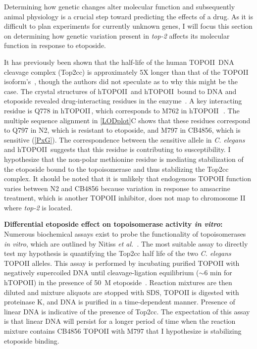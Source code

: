 \documentclass[12pt]{article}
\begin{document}
Determining how genetic changes alter molecular function and subsequently animal physiology is a crucial step toward predicting the effects of a drug. As it is difficult to plan experiments for currently unknown genes, I will focus this section on determining how genetic variation present in {\it top-2} affects its molecular function in response to etoposide.
\vspace{5pt}

It has previously been shown that the half-life of the human TOPOII\textalpha\, DNA cleavage complex (Top2cc) is approximately 5X longer than that of the TOPOII\textbeta\, isoform's~\cite{Bandele:2008df}, though the authors did not speculate as to why this might be the case. The crystal structures of hTOPOII\textalpha\, and hTOPOII\textbeta\, bound to DNA and etoposide revealed drug-interacting residues in the enzyme~\cite{Wu:2011ih,Wendorff:2012dg}. A key interacting residue is Q778 in hTOPOII\textbeta\,, which corresponds to M762 in hTOPOII\textalpha\,~\cite{Wu:2013dia}. The multiple sequence alignment in \autoref{LODplot}C shows that these residues correspond to Q797 in N2, which is resistant to etoposide, and M797 in CB4856, which is sensitive (\autoref{PxG}). The correspondence between the sensitive allele in {\it C. elegans} and hTOPOII\textalpha\, suggests that this residue is contributing to susceptibility. I hypothesize that the non-polar methionine residue is mediating stabilization of the etoposide bound to the topoisomerase and thus stabilizing the Top2cc complex. It should be noted that it is unlikely that endogenous TOPOII function varies between N2 and CB4856 because variation in response to amsacrine treatment, which is another TOPOII inhibitor, does not map to chromosome II where {\it top-2} is located. 

\vspace{5pt}

{\bf Differential etoposide effect on topoisomerase activity {\itshape in vitro}: }Numerous biochemical assays exist to probe the functionality of topoisomerases {\it in vitro}, which are outlined by Nitiss {\it et al.}~\cite{Nitiss:2001fv}. The most suitable assay to directly test my hypothesis is quantifying the Top2cc half life of the two {\it C. elegans} TOPOII alleles. This assay is performed by incubating purified TOPOII with negatively supercoiled DNA until cleavage-ligation equilibrium ($\sim$6 min for hTOPOII) in the presence of 50~\textmu M etoposide~\cite{Bandele:2007ko,Bandele:2008df}. Reaction mixtures are then diluted and mixture aliquots are stopped with SDS, TOPOII is digested with proteinase K, and DNA is purified in a time-dependent manner. Presence of linear DNA is indicative of the presence of Top2cc. The expectation of this assay is that linear DNA will persist for a longer period of time when the reaction mixture contains CB4856 TOPOII with M797 that I hypothesize is stabilizing etoposide binding.
\end{document}
